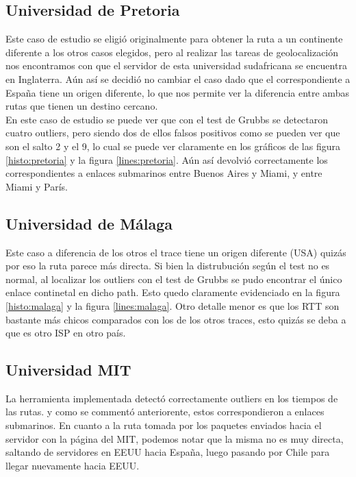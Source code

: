 \subsection{Universidad de Pretoria}
Este caso de estudio se eligió originalmente para obtener la ruta a un continente diferente a los otros casos elegidos, pero al realizar las tareas de geolocalización nos encontramos con que el servidor de esta universidad sudafricana se encuentra en Inglaterra. Aún así se decidió no cambiar el caso dado que el correspondiente a España tiene un origen diferente, lo que nos permite ver la diferencia entre ambas rutas que tienen un destino cercano. \\
En este caso de estudio se puede ver que con el test de Grubbs se detectaron cuatro outliers, pero siendo dos de ellos falsos positivos como se pueden ver que son el salto 2 y el 9, lo cual se puede ver claramente en los gráficos de las figura \ref{histo:pretoria} y la figura \ref{lines:pretoria}. Aún así devolvió correctamente los correspondientes a enlaces submarinos entre Buenos Aires y Miami, y entre Miami y París.

\subsection{Universidad de Málaga}
Este caso a diferencia de los otros el trace tiene un origen diferente (USA) quizás por eso la ruta parece más directa.
Si bien la distrubución según el test no es normal, al localizar los outliers con el test de Grubbs se pudo encontrar el único enlace continetal en dicho path. Esto quedo claramente evidenciado en la figura \ref{histo:malaga} y la figura \ref{lines:malaga}.
Otro detalle menor es que los RTT son bastante más chicos comparados con los de los otros traces, esto quizás se deba a que es otro ISP en otro país.



\subsection{Universidad MIT}
La herramienta implementada detectó correctamente outliers en los tiempos de las rutas. y como se commentó anteriorente, estos correspondieron a enlaces submarinos. En cuanto a la ruta tomada por los paquetes enviados hacia el servidor con la página del MIT, podemos notar que la misma no es muy directa, saltando de servidores en EEUU hacia España, luego pasando por Chile para llegar nuevamente hacia EEUU. 
